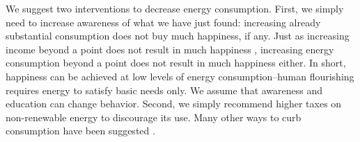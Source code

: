 \documentclass[10pt, letterpaper]{article}
\begin{document}
\begin{spacing}{1.0}


We suggest two interventions to decrease energy consumption. First, we simply
need to increase awareness of what we have just found: increasing
already substantial consumption does not buy much happiness, if any. Just as increasing  income
 beyond a point does not result in much happiness \citep{kahneman10}, increasing
 energy consumption beyond a point does not result in much happiness
 either. %
  In short, happiness can be achieved at low
 levels of energy consumption--human flourishing requires energy to satisfy
 basic needs only. We assume that awareness and education can change behavior.
 Second, we simply recommend higher taxes on non-renewable
 energy to discourage its use. Many other ways to
 curb consumption have been suggested \citep{dietz14B,dietz15,asensio15, dumas87,attari10}.





\newpage %






\end{spacing}
\end{document}
